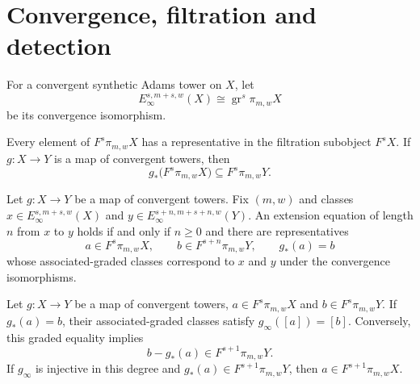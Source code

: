 \section{Convergence, filtration and detection}


\begin{definition}
\label{sem:ProofTools:infinity-graded}
For a convergent synthetic Adams tower on $X$, let
\[E_\infty^{s,m+s,w}(X)\cong\operatorname{gr}^s\pi_{m,w}X\]
be its convergence isomorphism.
\end{definition}

\begin{theorem}
\label{sem:ProofTools:filtration-representatives}
Every element of $F^s\pi_{m,w}X$ has a representative in the filtration subobject $F^sX$. If $g:X\to Y$ is a map of convergent towers, then
\[g_*\bigl(F^s\pi_{m,w}X\bigr)\subseteq F^s\pi_{m,w}Y.\]
\end{theorem}

\begin{theorem}
\label{sem:ProofTools:extension-representatives}
Let $g:X\to Y$ be a map of convergent towers. Fix $(m,w)$ and classes $x\in E_\infty^{s,m+s,w}(X)$ and $y\in E_\infty^{s+n,m+s+n,w}(Y)$. An extension equation of length $n$ from $x$ to $y$ holds if and only if $n\geq0$ and there are representatives
\[a\in F^s\pi_{m,w}X,\qquad b\in F^{s+n}\pi_{m,w}Y,\qquad g_*(a)=b\]
whose associated-graded classes correspond to $x$ and $y$ under the convergence isomorphisms.
\end{theorem}

\begin{theorem}
\label{sem:ProofTools:grade-naturality}
Let $g:X\to Y$ be a map of convergent towers, $a\in F^s\pi_{m,w}X$ and $b\in F^s\pi_{m,w}Y$. If $g_*(a)=b$, their associated-graded classes satisfy $g_\infty([a])=[b]$. Conversely, this graded equality implies
\[b-g_*(a)\in F^{s+1}\pi_{m,w}Y.\]
If $g_\infty$ is injective in this degree and $g_*(a)\in F^{s+1}\pi_{m,w}Y$, then $a\in F^{s+1}\pi_{m,w}X$.
\end{theorem}

